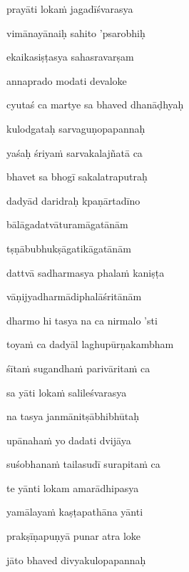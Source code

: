 \ujvers\nemsloka 
prayāti loka\.m jagadīśvarasya
\dontdisplaylinenum

\nemslokab 
vimānayānaiḥ sahito 'psarobhiḥ \danda\dontdisplaylinenum

\nemslokac 
ekaikasiṣṭasya sahasravarṣam
\dontdisplaylinenum

\nemslokad 
annaprado modati devaloke \veg\dontdisplaylinenum

\ujvers\nemsloka 
cyutaś ca martye sa bhaved dhanāḍhyaḥ
\dontdisplaylinenum

\nemslokab 
kulodgataḥ sarvaguṇopapannaḥ \danda\dontdisplaylinenum

\nemslokac 
yaśaḥ śriya\.m sarvakalajñatā ca
\dontdisplaylinenum

\nemslokad 
bhavet sa bhogī sakalatraputraḥ \veg\dontdisplaylinenum

\ujvers\nemsloka 
dadyād daridraḥ kpaṇārtadīno
\dontdisplaylinenum

\nemslokab 
bālāgadatvāturamāgatānām \danda\dontdisplaylinenum

\nemslokac 
tṣṇābubhukṣāgatikāgatānām
\dontdisplaylinenum

\nemslokad 
dattvā sadharmasya phala\.m kaniṣṭa \veg\dontdisplaylinenum

\ujvers\nemsloka 
vāṇijyadharmādiphalāśritānām
\dontdisplaylinenum

\nemslokab 
dharmo hi tasya na ca nirmalo 'sti \danda\dontdisplaylinenum

\nemslokac 
toya\.m ca dadyāl laghupūrṇakambham
\dontdisplaylinenum

\nemslokad 
śīta\.m sugandha\.m parivārita\.m ca \veg\dontdisplaylinenum

\ujvers\nemsloka 
sa yāti loka\.m salileśvarasya
\dontdisplaylinenum

\nemslokab 
na tasya janmānitṣābhibhūtaḥ \danda\dontdisplaylinenum

\nemslokac 
upānaha\.m yo dadati dvijāya
\dontdisplaylinenum

\nemslokad 
suśobhana\.m tailasudī surapita\.m ca \veg\dontdisplaylinenum

\ujvers\nemsloka 
te yānti lokam amarādhipasya
\dontdisplaylinenum

\nemslokab 
yamālaya\.m kaṣṭapathāna yānti \danda\dontdisplaylinenum

\nemslokac 
prakṣīṇapuṇyā punar atra loke
\dontdisplaylinenum

\nemslokad 
jāto bhaved divyakulopapannaḥ \veg\dontdisplaylinenum

